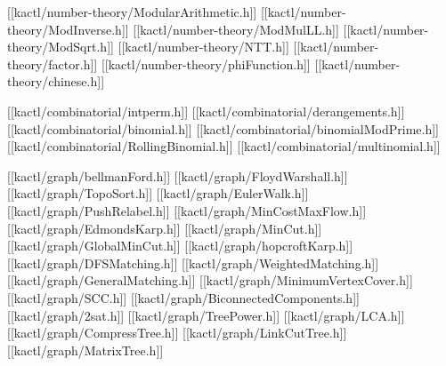 [[kactl/number-theory/ModularArithmetic.h]]
[[kactl/number-theory/ModInverse.h]]
[[kactl/number-theory/ModMulLL.h]]
[[kactl/number-theory/ModSqrt.h]]
[[kactl/number-theory/NTT.h]]
[[kactl/number-theory/factor.h]]
[[kactl/number-theory/phiFunction.h]]
[[kactl/number-theory/chinese.h]]

[[kactl/combinatorial/intperm.h]]
[[kactl/combinatorial/derangements.h]]
[[kactl/combinatorial/binomial.h]]
[[kactl/combinatorial/binomialModPrime.h]]
[[kactl/combinatorial/RollingBinomial.h]]
[[kactl/combinatorial/multinomial.h]]

[[kactl/graph/bellmanFord.h]]
[[kactl/graph/FloydWarshall.h]]
[[kactl/graph/TopoSort.h]]
[[kactl/graph/EulerWalk.h]]
[[kactl/graph/PushRelabel.h]]
[[kactl/graph/MinCostMaxFlow.h]]
[[kactl/graph/EdmondsKarp.h]]
[[kactl/graph/MinCut.h]]
[[kactl/graph/GlobalMinCut.h]]
[[kactl/graph/hopcroftKarp.h]]
[[kactl/graph/DFSMatching.h]]
[[kactl/graph/WeightedMatching.h]]
[[kactl/graph/GeneralMatching.h]]
[[kactl/graph/MinimumVertexCover.h]]
[[kactl/graph/SCC.h]]
[[kactl/graph/BiconnectedComponents.h]]
[[kactl/graph/2sat.h]]
[[kactl/graph/TreePower.h]]
[[kactl/graph/LCA.h]]
[[kactl/graph/CompressTree.h]]
[[kactl/graph/LinkCutTree.h]]
[[kactl/graph/MatrixTree.h]]

